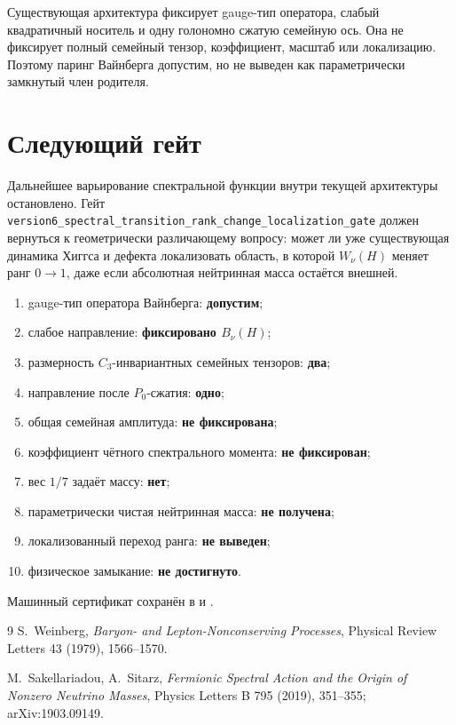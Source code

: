 \begin{proposition}
Существующая архитектура фиксирует gauge-тип оператора, слабый
квадратичный носитель и одну голономно сжатую семейную ось. Она не
фиксирует полный семейный тензор, коэффициент, масштаб или локализацию.
Поэтому паринг Вайнберга допустим, но не выведен как параметрически
замкнутый член родителя.
\end{proposition}

\section{Следующий гейт}

Дальнейшее варьирование спектральной функции внутри текущей архитектуры
остановлено. Гейт
\texttt{version6\_spectral\_transition\_rank\_change\_localization\_gate}
должен вернуться к геометрически различающему вопросу: может ли уже
существующая динамика Хиггса и дефекта локализовать область, в которой
$W_\nu(H)$ меняет ранг $0\to1$, даже если абсолютная нейтринная масса
остаётся внешней.

\begin{protocol}
\begin{enumerate}
 \item gauge-тип оператора Вайнберга: \textbf{допустим};
 \item слабое направление: \textbf{фиксировано $B_\nu(H)$};
 \item размерность $C_3$-инвариантных семейных тензоров:
 \textbf{два};
 \item направление после $P_0$-сжатия: \textbf{одно};
 \item общая семейная амплитуда: \textbf{не фиксирована};
 \item коэффициент чётного спектрального момента:
 \textbf{не фиксирован};
 \item вес $1/7$ задаёт массу: \textbf{нет};
 \item параметрически чистая нейтринная масса: \textbf{не получена};
 \item локализованный переход ранга: \textbf{не выведен};
 \item физическое замыкание: \textbf{не достигнуто}.
\end{enumerate}
\end{protocol}

Машинный сертификат сохранён в
 и
.

\begin{thebibliography}{9}
S.~Weinberg,
\emph{Baryon- and Lepton-Nonconserving Processes},
Physical Review Letters 43 (1979), 1566--1570.

M.~Sakellariadou, A.~Sitarz,
\emph{Fermionic Spectral Action and the Origin of Nonzero Neutrino Masses},
Physics Letters B 795 (2019), 351--355;
arXiv:1903.09149.
\end{thebibliography}
